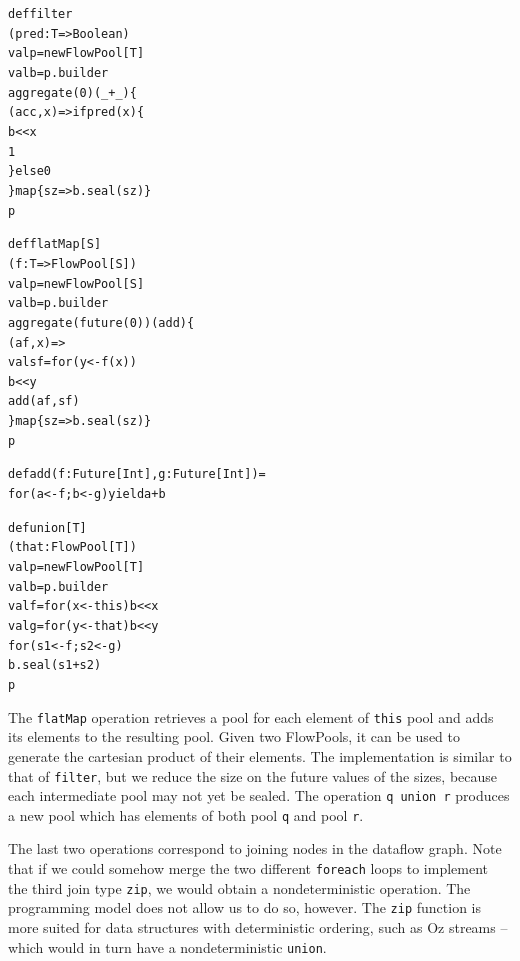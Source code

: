 \documentclass[runningheads,a4paper]{llncs}
\begin{document}
\noindent
\begin{minipage}[b]{4 cm}
\begin{alltt}
{\scriptsize
def filter
  (pred: T => Boolean)
  val p = new FlowPool[T]
  val b = p.builder
  aggregate(0)(_ + _) \{
    (acc, x) => if pred(x) \{
      b << x
      1
    \} else 0
  \} map \{ sz => b.seal(sz) \}
  p



}
\end{alltt}
\end{minipage}\begin{minipage}[b]{4 cm}
\begin{alltt}
{\scriptsize
def flatMap[S]
  (f: T => FlowPool[S])
  val p = new FlowPool[S]
  val b = p.builder
  aggregate(future(0))(add) \{
    (af, x) =>
    val sf = for (y <- f(x))
      b << y
    add(af, sf)
  \} map \{ sz => b.seal(sz) \}
  p

def add(f: Future[Int], g: Future[Int]) =
  for (a <- f; b <- g) yield a + b
}
\end{alltt}
\end{minipage}
\begin{minipage}[b]{4 cm}
\begin{alltt}
{\scriptsize
def union[T]
  (that: FlowPool[T])
  val p = new FlowPool[T]
  val b = p.builder
  val f = for (x <- this) b << x
  val g = for (y <- that) b << y
  for (s1 <- f; s2 <- g)
    b.seal(s1 + s2)
  p





}
\end{alltt}
\end{minipage}

The \verb=flatMap= operation retrieves a pool for each element of
\verb=this= pool and adds its elements to the resulting pool.
Given two FlowPools, it can be used to generate the cartesian product
of their elements.
The implementation is similar to that of \verb=filter=,
but we reduce the size on the future values of the sizes, because each
intermediate pool may not yet be sealed.
The operation \verb=q union r= produces a new pool which has elements of
both pool \verb=q= and pool \verb=r=.

The last two operations correspond to joining nodes in the dataflow
graph.
Note that if we could somehow merge the two different \verb=foreach=
loops to implement the third join type \verb=zip=, we would
obtain a nondeterministic operation.
The programming model does not allow us to do so, however.
The \verb=zip= function is more suited for data structures with deterministic ordering,
such as Oz streams -- which would in turn have a nondeterministic \verb=union=.
\end{document}

